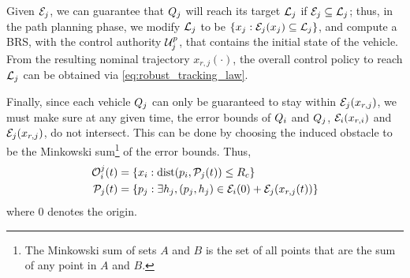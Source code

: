 Given $\mathcal{E}_j$, we can guarantee that $Q_j$ will reach its target $\mathcal{L}_j$ if $\mathcal{E}_j \subseteq \mathcal{L}_j$; thus, in the path planning phase, we modify $\mathcal{L}_j$ to be $\{x_j: \mathcal{E}_j(x_j) \subseteq \mathcal{L}_j\}$, and compute a BRS, with the control authority $\mathcal{U}^p_j$, that contains the initial state of the vehicle. From the resulting nominal trajectory $x_{r,j}(\cdot)$, the overall control policy to reach $\mathcal{L}_j$ can be obtained via \eqref{eq:robust_tracking_law}.

Finally, since each vehicle $Q_j$ can only be guaranteed to stay within $\mathcal{E}_j(x_{r,j})$, we must make sure at any given time, the error bounds of $Q_i$ and $Q_j$, $\mathcal{E}_i(x_{r,i})$ and $\mathcal{E}_j(x_{r,j})$, do not intersect. This can be done by choosing the induced obstacle to be the Minkowski sum\footnote{The Minkowski sum of sets $A$ and $B$ is the set of all points that are the sum of any point in $A$ and $B$.} of the error bounds. Thus,
\vspace{-0.3em}
\begin{equation} \label{eqn:rttObs}
\begin{aligned}
\ioset_i^j(t) &= \{x_i: \dist(\pos_i, \pfrs_j(t)) \le \cradius \} \\
\pfrs_j(t) &= \{p_j: \exists \npos_j, (p_j, \npos_j) \in \errorbound_i(0) + \errorbound_j(x_{r,j}(t)) \}
\end{aligned}
\end{equation}
\noindent where $0$ denotes the origin. 

